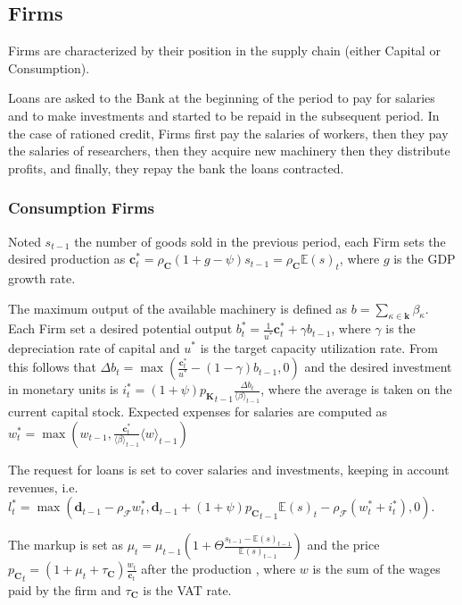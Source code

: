 \documentclass[a4paper, headings=standardclasses]{scrartcl}
\begin{document}
\subsection{Firms}
Firms are characterized by their position in the supply chain (either Capital or Consumption).

Loans are asked to the Bank at the beginning of the period to pay for salaries and to make investments and started to be repaid in the subsequent period.
In the case of rationed credit, Firms first pay the salaries of workers, then they pay the salaries of researchers, then they acquire new machinery then they distribute profits, and finally, they repay the bank the loans contracted.

\subsubsection{Consumption Firms}
Noted $s_{t-1}$ the number of goods sold in the previous period, each Firm sets the desired production as $\mathbf{c}^*_t = \rho_\mathbf{C}(1+g-\psi)s_{t-1} = \rho_\mathbf{C}{\mathbb{E}(s)}_t$, where $g$ is the GDP growth rate.

The maximum output of the available machinery is defined as $b = \sum_{\kappa \in \mathbf{k}} \beta_\kappa$. Each Firm set a desired potential output $b^*_t = \frac{1}{u^*}\mathbf{c}^*_t + \gamma b_{t-1}$, where $\gamma$ is the depreciation rate of capital and $u^*$ is the target capacity utilization rate. From this follows that ${\Delta b}_t = \max(\frac{\mathbf{c}^*_t}{u^*} - (1 - \gamma) b_{t-1}, 0)$ and the desired investment in monetary units is $i^*_t = (1+\psi){p_\mathbf{K}}_{t-1}\frac{{\Delta b}_t}{{\langle \beta \rangle}_{t-1}}$, where the average is taken on the current capital stock. Expected expenses for salaries are computed as $w_t^* = \max(w_{t-1}, \frac{\mathbf{c}^*_t}{{\langle \beta \rangle}_{t-1}}{\langle w \rangle}_{t-1})$

The request for loans is set to cover salaries and investments, keeping in account revenues, i.e. $l_t^* = \max(\mathbf{d}_{t-1} - \rho_\mathcal{F} w_t^*, \mathbf{d}_{t-1} + (1+\psi){p_\mathbf{C}}_{t-1} {\mathbb{E}(s)}_t - \rho_\mathcal{F} (w_t^* + i_t^*), 0)$.

The markup is set as $\mu_t = \mu_{t-1}(1 + \Theta \frac{s_{t-1}-{\mathbb{E}(s)}_{t-1}}{{\mathbb{E}(s)}_{t-1}})$ and the price ${p_\mathbf{C}}_t = (1+\mu_t+\tau_\mathbf{C})\frac{w_t}{\mathbf{c}_t}$ after the production \parencite[like in][]{caiani2016}, where $w$ is the sum of the wages paid by the firm and $\tau_\mathbf{C}$ is the VAT rate.
\end{document}
